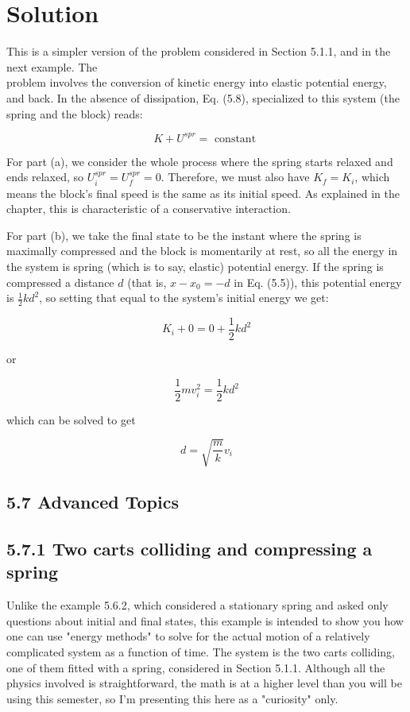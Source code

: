 \documentclass[10pt]{article}
\begin{document}
\section*{Solution}
This is a simpler version of the problem considered in Section 5.1.1, and in the next example. The\\
problem involves the conversion of kinetic energy into elastic potential energy, and back. In the absence of dissipation, Eq. (5.8), specialized to this system (the spring and the block) reads:


\begin{equation*}
K+U^{s p r}=\text { constant } \tag{5.13}
\end{equation*}


For part (a), we consider the whole process where the spring starts relaxed and ends relaxed, so $U_{i}^{s p r}=U_{f}^{s p r}=0$. Therefore, we must also have $K_{f}=K_{i}$, which means the block's final speed is the same as its initial speed. As explained in the chapter, this is characteristic of a conservative interaction.

For part (b), we take the final state to be the instant where the spring is maximally compressed and the block is momentarily at rest, so all the energy in the system is spring (which is to say, elastic) potential energy. If the spring is compressed a distance $d$ (that is, $x-x_{0}=-d$ in Eq. (5.5)), this potential energy is $\frac{1}{2} k d^{2}$, so setting that equal to the system's initial energy we get:


\begin{equation*}
K_{i}+0=0+\frac{1}{2} k d^{2} \tag{5.14}
\end{equation*}


or

$$
\frac{1}{2} m v_{i}^{2}=\frac{1}{2} k d^{2}
$$

which can be solved to get

$$
d=\sqrt{\frac{m}{k}} v_{i}
$$

\subsection*{5.7 Advanced Topics}
\subsection*{5.7.1 Two carts colliding and compressing a spring}
Unlike the example 5.6.2, which considered a stationary spring and asked only questions about initial and final states, this example is intended to show you how one can use "energy methods" to solve for the actual motion of a relatively complicated system as a function of time. The system is the two carts colliding, one of them fitted with a spring, considered in Section 5.1.1. Although all the physics involved is straightforward, the math is at a higher level than you will be using this semester, so I'm presenting this here as a "curiosity" only.
\end{document}
